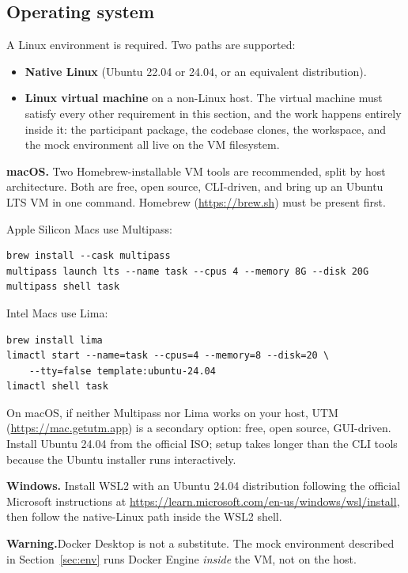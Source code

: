 \documentclass[11pt, a4paper]{article}
\newcommand{\warn}[1]{%
    \begin{mdframed}[linecolor=warnborder]
    \textbf{\textcolor{warnborder}{Warning.}}\enspace #1
    \end{mdframed}%
}
\begin{document}
\subsection{Operating system}
\label{sec:os}

A Linux environment is required. Two paths are supported:

\begin{itemize}
    \item \textbf{Native Linux} (Ubuntu 22.04 or 24.04, or an equivalent distribution).
    \item \textbf{Linux virtual machine} on a non-Linux host. The virtual machine must satisfy every other requirement in this section, and the work happens entirely inside it: the participant package, the codebase clones, the workspace, and the mock environment all live on the VM filesystem.
\end{itemize}

\textbf{macOS.} Two Homebrew-installable VM tools are recommended, split by host architecture. Both are free, open source, CLI-driven, and bring up an Ubuntu LTS VM in one command. Homebrew (\url{https://brew.sh}) must be present first.

Apple Silicon Macs use Multipass:

\begin{verbatim}
brew install --cask multipass
multipass launch lts --name task --cpus 4 --memory 8G --disk 20G
multipass shell task
\end{verbatim}

Intel Macs use Lima:

\begin{verbatim}
brew install lima
limactl start --name=task --cpus=4 --memory=8 --disk=20 \
    --tty=false template:ubuntu-24.04
limactl shell task
\end{verbatim}

On macOS, if neither Multipass nor Lima works on your host, UTM (\url{https://mac.getutm.app}) is a secondary option: free, open source, GUI-driven. Install Ubuntu 24.04 from the official ISO; setup takes longer than the CLI tools because the Ubuntu installer runs interactively.

\textbf{Windows.} Install WSL2 with an Ubuntu 24.04 distribution following the official Microsoft instructions at \url{https://learn.microsoft.com/en-us/windows/wsl/install}, then follow the native-Linux path inside the WSL2 shell.

\warn{Docker Desktop is not a substitute. The mock environment described in Section~\ref{sec:env} runs Docker Engine \emph{inside} the VM, not on the host.}
\end{document}
